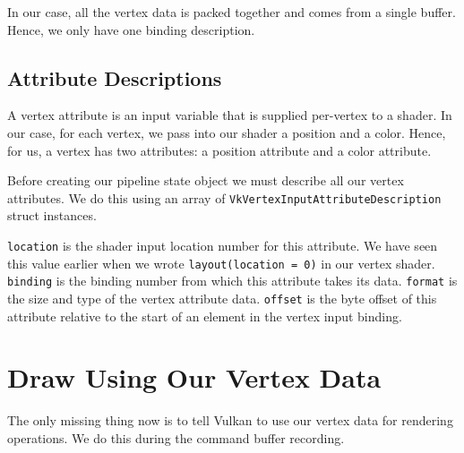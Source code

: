 In our case, all the vertex data is packed together and comes from a single buffer.
Hence, we only have one binding description.

\begin{minipage}{\linewidth}{\noindent}
    
\end{minipage}

\subsection{Attribute Descriptions}

A vertex attribute is an input variable that is supplied per-vertex to a shader.
In our case, for each vertex, we pass into our shader a position and a color.
Hence, for us, a vertex has two attributes: a position attribute and a
color attribute.

Before creating our pipeline state object we must describe all our
vertex attributes.
We do this using an array of \texttt{VkVertexInputAttributeDescription} struct
instances.

\begin{minipage}{\linewidth}{\noindent}
    
\end{minipage}

\texttt{location} is the shader input location number for this attribute.
We have seen this value earlier when we wrote \texttt{layout(location = 0)}
in our vertex shader.
\texttt{binding} is the binding number from which this attribute takes its data.
\texttt{format} is the size and type of the vertex attribute data.
\texttt{offset} is the byte offset of this attribute relative to the start of
an element in the vertex input binding.

\section{Draw Using Our Vertex Data}

The only missing thing now is to tell Vulkan to use our vertex data
for rendering operations.
We do this during the command buffer recording.

\begin{minipage}{\linewidth}{\noindent}
    
\end{minipage}
